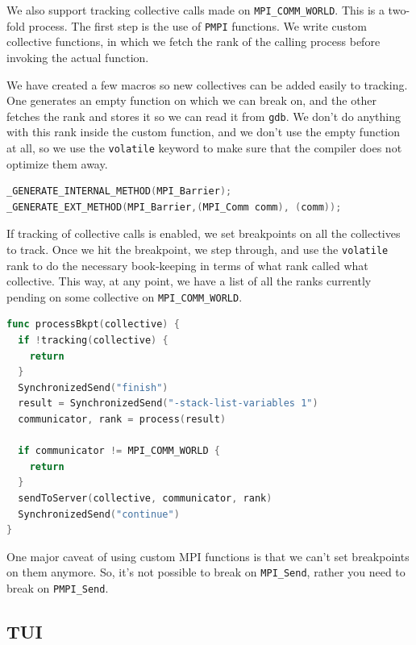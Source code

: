 \documentclass[10pt,conference]{IEEEtran}
\begin{document}
We also support tracking collective calls made on \texttt{MPI\_COMM\_WORLD}. This is a two-fold process. The first step is the use of \texttt{PMPI} functions. We write custom collective functions, in which we fetch the rank of the calling process before invoking the actual function.

We have created a few macros so new collectives can be added easily to tracking. One generates an empty function on which we can break on, and the other fetches the rank and stores it so we can read it from \texttt{gdb}. We don't do anything with this rank inside the custom function, and we don't use the empty function at all, so we use the \texttt{volatile} keyword to make sure that the compiler does not optimize them away.

\begin{samepage}
\begin{lstlisting}[language=C, caption=Collective call instrumentation]
_GENERATE_INTERNAL_METHOD(MPI_Barrier);
_GENERATE_EXT_METHOD(MPI_Barrier,(MPI_Comm comm), (comm));
\end{lstlisting}
\end{samepage}

If tracking of collective calls is enabled, we set breakpoints on all the collectives to track. Once we hit the breakpoint, we step through, and use the \texttt{volatile} rank to do the necessary book-keeping in terms of what rank called what collective. This way, at any point, we have a list of all the ranks currently pending on some collective on \texttt{MPI\_COMM\_WORLD}.

\begin{samepage}
  \begin{lstlisting}[language=Go, caption=Pseudocode for processing collectives inside Go]
func processBkpt(collective) {
  if !tracking(collective) {
    return
  }
  SynchronizedSend("finish")
  result = SynchronizedSend("-stack-list-variables 1")
  communicator, rank = process(result)

  if communicator != MPI_COMM_WORLD {
    return
  }
  sendToServer(collective, communicator, rank)
  SynchronizedSend("continue")
}
\end{lstlisting}
\end{samepage}


One major caveat of using custom MPI functions is that we can't set breakpoints on them anymore. So, it's not possible to break on \texttt{MPI\_Send}, rather you need to break on \texttt{PMPI\_Send}.

\subsection{TUI}
\end{document}
